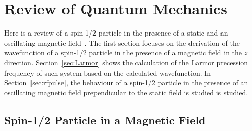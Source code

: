\chapter{Review of Quantum Mechanics\label{chap:qm}}
Here is a review of a spin-1/2 particle in the presence of a static
and an oscillating magnetic field~\cite{NMR_Notes}. The first section
focuses on the derivation of the wavefunction of a spin-1/2 particle
in the presence of a magnetic field in the $z$
direction. Section~\ref{sec:Larmor} shows the calculation of the
Larmor precession frequency of such system based on the calculated
wavefunction. In Section~\ref{sec:rfpulse}, the behaviour of a
spin-1/2 particle in the presence of an oscillating magnetic field
prependicular to the static field is studied is studied.

\section{Spin-1/2 Particle in a Magnetic Field}

